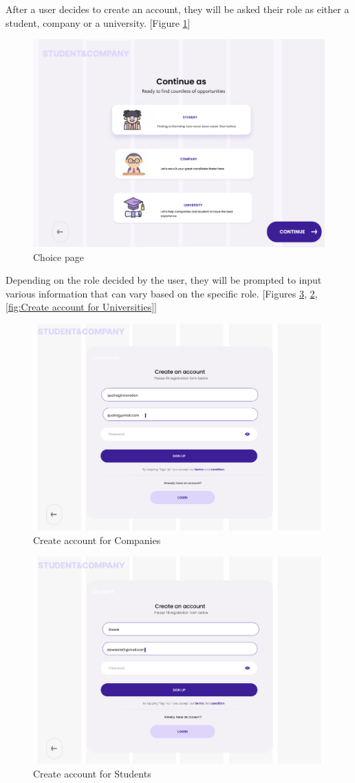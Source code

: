 After a user decides to create an account, they will be asked their role as either a student, company or a university. [Figure \ref{fig:Choice page}] 

\begin{figure} [H]
    \centering
    \includegraphics[width=0.5\linewidth]{Interface Images/log in sing up/Screenshot 2024-12-03 110046.png}
    \caption{Choice page}
    \label{fig:Choice page}
\end{figure}

Depending on the role decided by the user, they will be prompted to input various information that can vary based on the specific role. [Figures \ref{fig:Create account for Students}, \ref{fig: Create account for companies}, \ref{fig:Create account for Universities}] 

\begin{figure} [H]
    \centering
    \includegraphics[width=0.5\linewidth]{Interface Images/log in sing up/Screenshot 2024-12-12 045014.png}
    \caption{Create account for Companies }
    \label{fig: Create account for companies}
\end{figure}

\begin{figure} [H]
    \centering
    \includegraphics[width=0.5\linewidth]{Interface Images/log in sing up/Screenshot 2024-12-12 045029.png}
    \caption{Create account for Students}
    \label{fig:Create account for Students}
\end{figure}

